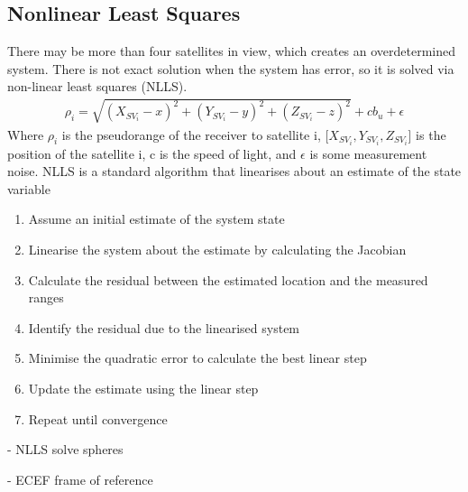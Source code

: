 \subsection{Nonlinear Least Squares} \label{sec:NLLS}
There may be more than four satellites in view, which creates an overdetermined system. There is not exact solution when the system has error, so it is solved via non-linear least squares (NLLS).
\begin{eqnarray}
\rho_i = \sqrt{(X_{SV_i}-x)^2+(Y_{SV_i}-y)^2+(Z_{SV_i}-z)^2} +cb_u + \epsilon
\end{eqnarray}
Where $\rho_i$ is the pseudorange of the receiver to satellite i, [$X_{SV_i},Y_{SV_i},Z_{SV_i}$] is the position of the satellite i, c is the speed of light, and $\epsilon$ is some measurement noise. NLLS is a standard algorithm that linearises about an estimate of the state variable
\begin{enumerate}
\item Assume an initial estimate of the system state
\item Linearise the system about the estimate by calculating the Jacobian
\item Calculate the residual between the estimated location and the measured ranges
\item Identify the residual due to the linearised system
\item Minimise the quadratic error to calculate the best linear step
\item Update the estimate using the linear step
\item Repeat until convergence
\end{enumerate}






- NLLS solve spheres

- ECEF frame of reference